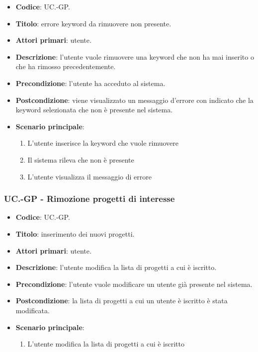 	\begin{itemize}
		\item \textbf{Codice}: UC\theuccount.\thesubuccount-GP.
		\item \textbf{Titolo}: errore keyword da rimuovere non presente.
		\item \textbf{Attori primari}: utente.
		\item \textbf{Descrizione}: l'utente vuole rimuovere una keyword che non ha mai inserito o che ha rimosso precedentemente.
		\item \textbf{Precondizione}: l’utente ha acceduto al sistema.
		\item \textbf{Postcondizione}: viene visualizzato un messaggio d'errore con indicato che la keyword	selezionata che non è presente nel sistema.
		\item \textbf{Scenario principale}:
		\begin{enumerate}
			\item L'utente inserisce la keyword che vuole rimuovere
			\item Il sistema rileva che non è presente
			\item L'utente visualizza il messaggio di errore
		\end{enumerate}
	\end{itemize}

    \subsubsection{UC\theuccount.\thesubuccount-GP - Rimozione progetti di interesse}
    
    \begin{itemize}
        \item \textbf{Codice}: UC\theuccount.\thesubuccount-GP.
        \item \textbf{Titolo}: inserimento dei nuovi progetti.
        \item \textbf{Attori primari}: utente.
        \item \textbf{Descrizione}: l'utente modifica la lista di progetti a cui è iscritto.
        \item \textbf{Precondizione}: l'utente vuole modificare un utente già presente nel sistema.
        \item \textbf{Postcondizione}: la lista di progetti a cui un utente è iscritto è stata modificata.
        \item \textbf{Scenario principale}:
        \begin{enumerate}
            \item L'utente modifica la lista di progetti a cui è iscritto
        \end{enumerate}
    \end{itemize}
    
